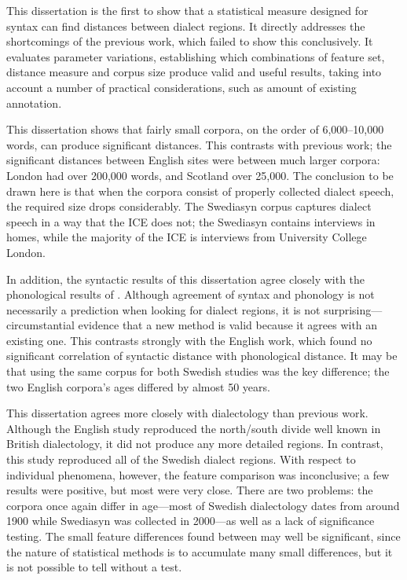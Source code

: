 This dissertation is the first to show that a statistical measure
designed for syntax can find distances between dialect regions. It
directly addresses the shortcomings of the previous work, which failed
to show this conclusively. It evaluates parameter variations,
establishing which combinations of feature set, distance measure and
corpus size produce valid and useful results, taking into account a
number of practical considerations, such as amount of existing
annotation.

This dissertation shows that fairly small corpora, on the order of
6,000--10,000 words, can produce significant distances. This
contrasts with previous work; the significant distances between
English sites were between much larger corpora: London had over
200,000 words, and Scotland over 25,000. The conclusion to be drawn
here is that when the corpora consist of properly collected dialect
speech, the required size drops considerably. The Swediasyn corpus
captures dialect speech in a way that the ICE does not; the Swediasyn
contains interviews in homes, while the majority of the ICE is
interviews from University College London.

In addition, the syntactic results of this dissertation agree closely
with the phonological results of . Although
agreement of syntax and phonology is not necessarily a prediction when
looking for dialect regions, it is not surprising---circumstantial
evidence that a new method is valid because it agrees with an existing
one. This contrasts strongly with the English work, which found no
significant correlation of syntactic distance with phonological
distance. It may be that using the same corpus for both Swedish
studies was the key difference; the two English corpora's ages differed by
almost 50 years.

This dissertation agrees more closely with dialectology than previous
work. Although the English study reproduced the north/south divide
well known in British dialectology, it did not produce any more
detailed regions. In contrast, this study reproduced all of the
Swedish dialect regions. With respect to individual phenomena,
however, the feature comparison was inconclusive; a few results were
positive, but most were very close. There are two problems: the
corpora once again differ in age---most of Swedish dialectology dates
from around 1900 while Swediasyn was collected in 2000---as well as a
lack of significance testing. The small feature differences found
between may well be significant, since the nature of statistical
methods is to accumulate many small differences, but it is not
possible to tell without a test.

